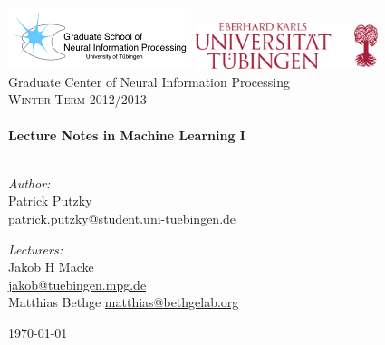 \begin{titlepage}

\begin{center}


\includegraphics[width=0.4\textwidth]{./titlepage/logo_gtc.png} \bigskip 
\includegraphics[width=0.4\textwidth]{./titlepage/logo_uni.png}\\[1cm]    

\LARGE Graduate Center of Neural Information Processing\\[1.5cm]


\textsc{\Large Winter Term 2012/2013}\\[0.3cm]
\HRule \\[0.5cm]
{ \huge \bfseries Lecture Notes in Machine Learning I}\\[0.4cm]

\HRule \\[1.5cm]

\begin{minipage}{0.45\textwidth}
\begin{flushleft} \large
\emph{Author:}\\
 Patrick Putzky \\
 \href{mailto:patrick.putzky@student.uni-tuebingen.de}{patrick.putzky@student.uni-tuebingen.de} \\
\end{flushleft}
\end{minipage}
\begin{minipage}{0.45\textwidth}
\begin{flushright} \large
\emph{Lecturers:} \\
 Jakob H Macke \\
 \href{mailto:jakob@tuebingen.mpg.de}{jakob@tuebingen.mpg.de} \\
 Matthias Bethge
 \href{mailto:matthias@bethgelab.org}{matthias@bethgelab.org} \\

\end{flushright}
\end{minipage}

\vfill

{\large \today}

\end{center}

\end{titlepage}